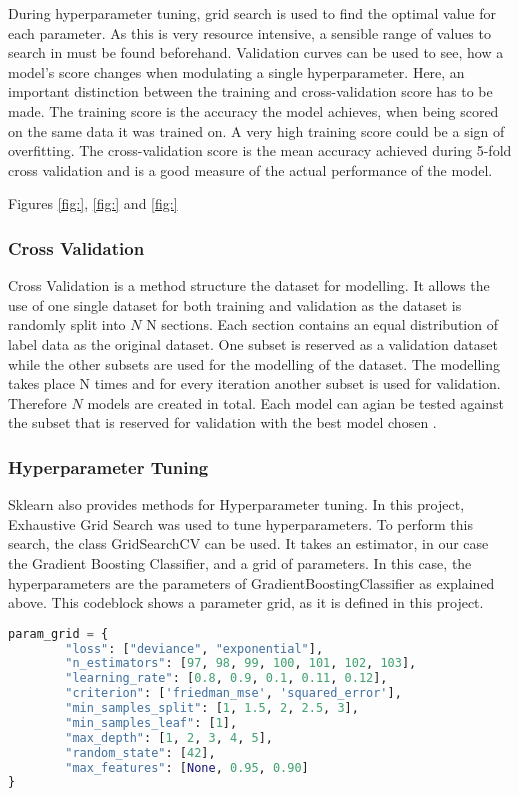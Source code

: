 During hyperparameter tuning, grid search is used to find the optimal value for each parameter.
As this is very resource intensive, a sensible range of values to search in must be found beforehand.
Validation curves can be used to see, how a model's score changes when modulating a single hyperparameter.
Here, an important distinction between the training and cross-validation score has to be made.
The training score is the accuracy the model achieves, when being scored on the same data it was trained on.
A very high training score could be a sign of overfitting.
The cross-validation score is the mean accuracy achieved during 5-fold cross validation and is a good measure
of the actual performance of the model.

Figures \ref{fig:}, \ref{fig:} and \ref{fig:}


\subsubsection{Cross Validation}

Cross Validation is a method structure the dataset for modelling. It allows the use of 
one single dataset for both training and validation as the dataset is randomly split into \(N\) N sections. Each 
section contains an equal distribution of label data as the original dataset. One subset is reserved as a 
validation dataset while the other subsets are used for the modelling of the dataset. The modelling takes place 
N times and for every iteration another subset is used for validation. Therefore \(N\) models are created in total. 
Each model can agian be tested against the subset that is reserved for validation with the best model chosen \cite[p.8f]{lewis2000introduction}. 

\subsubsection{Hyperparameter Tuning}

Sklearn also provides methods for Hyperparameter tuning. In this project, Exhaustive Grid Search was used to 
tune hyperparameters. To perform this search, the class GridSearchCV can be used. It takes an 
estimator, in our case the Gradient Boosting Classifier, and a grid of parameters.
In this case, the hyperparameters are the parameters of GradientBoostingClassifier as 
explained above. This codeblock shows a parameter grid, as it is defined in this project.

\begin{lstlisting}[language=Python]
    param_grid = {
        "loss": ["deviance", "exponential"],
        "n_estimators": [97, 98, 99, 100, 101, 102, 103],
        "learning_rate": [0.8, 0.9, 0.1, 0.11, 0.12],
        "criterion": ['friedman_mse', 'squared_error'],
        "min_samples_split": [1, 1.5, 2, 2.5, 3],
        "min_samples_leaf": [1],
        "max_depth": [1, 2, 3, 4, 5],
        "random_state": [42],
        "max_features": [None, 0.95, 0.90]
}
\end{lstlisting}


